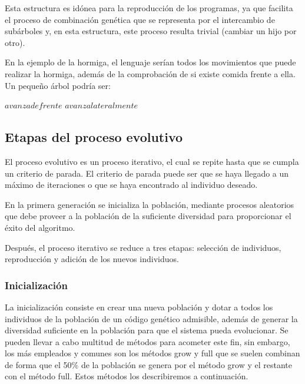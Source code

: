Esta estructura es idónea para la reproducción de los programas, ya que facilita
el proceso de combinación genética que se representa por el intercambio de
subárboles y, en esta estructura, este proceso resulta trivial (cambiar un hijo
por otro).

En la ejemplo de la hormiga, el lenguaje serían todos los movimientos que puede
realizar la hormiga, además de la comprobación de si existe comida frente a ella.
Un pequeño árbol podría ser:

\begin{algorithmic}
    \STATE $avanzadefrente$
\ELSE 
	\STATE $avanzalateralmente$
\ENDIF 
\end{algorithmic}

\subsection{Etapas del proceso evolutivo}

El proceso evolutivo es un proceso iterativo, el cual se repite hasta que se
cumpla un criterio de parada. El criterio de parada puede ser que se haya llegado
a un máximo de iteraciones o que se haya encontrado al individuo deseado.

En la primera generación se inicializa la población, mediante procesos aleatorios
que debe proveer a la población de la suficiente diversidad para proporcionar el
éxito del algoritmo.

Después, el proceso iterativo se reduce a tres etapas: selección de individuos,
reproducción y adición de los nuevos individuos.

\subsubsection{Inicialización}\label{subsubsec:inittree}

La inicialización consiste en crear una nueva población y dotar a todos
los individuos de la población de un código genético admisible, además de generar
la diversidad suficiente en la población para que el sistema pueda evolucionar.
Se pueden llevar a cabo multitud de métodos para acometer este fin, sin embargo,
los más empleados y comunes son los métodos grow y  full que se suelen combinan
de forma que el 50\% de la población se genera por el método grow y el restante
con el método full. Estos métodos los describiremos a continuación.

